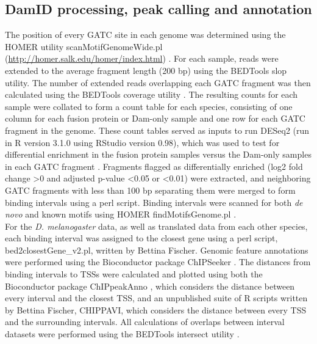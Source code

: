\subsection{DamID processing, peak calling and annotation}
The position of every GATC site in each genome was determined using the HOMER utility scanMotifGenomeWide.pl (\url{http://homer.salk.edu/homer/index.html}) \citep{heinz_simple_2010}. For each sample, reads were extended to the average fragment length (200 bp) using the BEDTools slop utility. The number of extended reads overlapping each GATC fragment was then calculated using the BEDTools coverage utility \citep{quinlan_bedtools:_2010}. The resulting counts for each sample were collated to form a count table for each species, consisting of one column for each fusion protein or Dam-only sample and one row for each GATC fragment in the genome. These count tables served as inputs to run DESeq2 (run in R version 3.1.0 using RStudio version 0.98), which was used to test for differential enrichment in the fusion protein samples versus the Dam-only samples in each GATC fragment \citep{love_moderated_2014}. Fragments flagged as differentially enriched (log2 fold change \textgreater 0 and adjusted p-value \textless 0.05 or \textless 0.01) were extracted, and neighboring GATC fragments with less than 100 bp separating them were merged to form binding intervals using a perl script. Binding intervals were scanned for both \emph{de novo} and known motifs using HOMER findMotifsGenome.pl \citep{heinz_simple_2010}.\\

For the \emph{D. melanogaster} data, as well as translated data from each other species, each binding interval was assigned to the closest gene using a perl script, bed2closestGene\_v2.pl, written by Bettina Fischer. Genomic feature annotations were performed using the Bioconductor package ChIPSeeker \citep{yu_chipseeker_2014}. The distances from binding intervals to TSSs were calculated and plotted using both the Bioconductor package ChIPpeakAnno \citep{zhu_chippeakanno:_2010}, which considers the distance between every interval and the closest TSS, and an unpublished suite of R scripts written by Bettina Fischer, CHIPPAVI, which considers the distance between every TSS and the surrounding intervals. All calculations of overlaps between interval datasets were performed using the BEDTools intersect utility \citep{quinlan_bedtools:_2010}.

